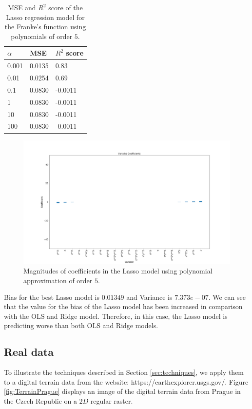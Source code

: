 \documentclass [11pt]{article}
\begin{document}
\begin{table}[H]
\centering
\begin{tabular}{lll}
\hline
$\alpha$ & MSE    & $R^{2}$ score \\ \hline
0.001     & 0.0135 & 0.83          \\
0.01      & 0.0254 & 0.69          \\
0.1       & 0.0830 & -0.0011       \\
1         & 0.0830 & -0.0011       \\
10        & 0.0830 & -0.0011       \\
100       & 0.0830 & -0.0011       \\ \hline
\end{tabular}
\caption{MSE and $R^{2}$ score of the Lasso regression model for the Franke's function using polynomials of order $5$.}
\label{tab:LassoFranke5}
\end{table}

\begin{figure}[H]
\centering
\includegraphics[width=1\textwidth]{figures/coeffLasso.png}
        \caption{Magnitudes of coefficients in the Lasso model using polynomial approximation of order $5$.}
        \label{fig:coeffLasso}
\end{figure}

Bias for the best Lasso model is $0.01349$ and Variance is $7.373e-07$. We can see that the value for the bias of the Lasso model has been increased in comparison with the OLS and Ridge model. Therefore, in this case, the Lasso model is predicting worse than both OLS and Ridge models.

\subsection{Real data}
\label{sec:realdata}
To illustrate the techniques described in Section \ref{sec:techniques}, we apply them to a digital terrain data from the website: https://earthexplorer.usgs.gov/. Figure \ref{fig:TerrainPrague} displays an image of the digital terrain data from Prague in the Czech Republic on a $2D$ regular raster. \\
\end{document}
